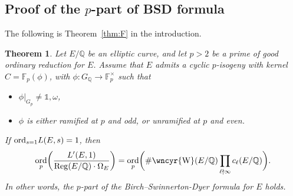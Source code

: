 \documentclass[10pt]{amsart}
\newcommand{\sha}{\text{\wncyr{W}}}
\numberwithin{equation}{section}
\newtheorem{theorem}{Theorem}
\theoremstyle{definition}
\theoremstyle{remark}
\newcommand{\bQ}{\mathbb{Q}}
\newcommand{\Q}{\mathbb{Q}}
\DeclareMathOperator{\ord}{ord}
\begin{document}
\subsection{Proof of the \texorpdfstring{$p$}{p}-part of BSD formula} 

The following is Theorem~\ref{thm:F} in the introduction.

\begin{theorem}\label{thm:thmC}
Let $E/\bQ$ be an elliptic curve, and let $p>2$ be a prime of good ordinary reduction for $E$. Assume that $E$ admits a cyclic $p$-isogeny with kernel $C=\mathbb{F}_p(\phi)$, with $\phi:G_\bQ\rightarrow\mathbb{F}_p^\times$ such that
\begin{itemize}
\item $\phi\vert_{G_p}\neq\mathds{1},\omega$,
\item $\phi$ is either ramified at $p$ and odd, or unramified at $p$ and even.
\end{itemize}
If ${\rm ord}_{s=1}L(E,s)=1$, then 
\[
\ord_{p}\biggl(\frac{L'(E, 1)}{\operatorname{Reg}(E / \Q) \cdot \Omega_{E}}\biggr)=\ord_{p}\biggl(\# \sha(E / \Q) \prod_{\ell \nmid \infty} c_{\ell}(E / \Q)\biggr).
\]
In other words, the $p$-part of the Birch--Swinnerton-Dyer formula for $E$ holds.
\end{theorem}
\end{document}
